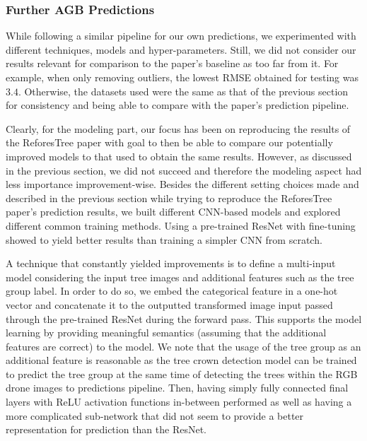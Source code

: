 \documentclass[10pt,twocolumn,letterpaper]{article}
\begin{document}
\subsubsection{Further AGB Predictions}
While following a similar pipeline for our own predictions, we experimented with different techniques, models and hyper-parameters. Still, we did not consider our results relevant for comparison to the paper's baseline as too far from it. For example, when only removing outliers, the lowest RMSE obtained for testing was $3.4$. Otherwise, the datasets used were the same as that of the previous section for consistency and being able to compare with the paper's prediction pipeline. 

Clearly, for the modeling part, our focus has been on reproducing the results of the ReforesTree paper with goal to then be able to compare our potentially improved models to that used to obtain the same results. However, as discussed in the previous section, we did not succeed and therefore the modeling aspect had less importance improvement-wise. Besides the different setting choices made and described in the previous section while trying to reproduce the ReforesTree paper's prediction results, we built different CNN-based models and explored different common training methods. Using a pre-trained ResNet with fine-tuning showed to yield better results than training a simpler CNN from scratch.

A technique that constantly yielded improvements is to define a multi-input model considering the input tree images and additional features such as the tree group label. In order to do so, we embed the categorical feature in a one-hot vector and concatenate it to the outputted transformed image input passed through the pre-trained ResNet during the forward pass. This supports the model learning by providing meaningful semantics (assuming that the additional features are correct) to the model. We note that the usage of the tree group as an additional feature is reasonable as the tree crown detection model can be trained to predict the tree group at the same time of detecting the trees within the RGB drone images to predictions pipeline. Then, having simply fully connected final layers with ReLU activation functions in-between performed as well as having a more complicated sub-network that did not seem to provide a better representation for prediction than the ResNet.

\end{document}
